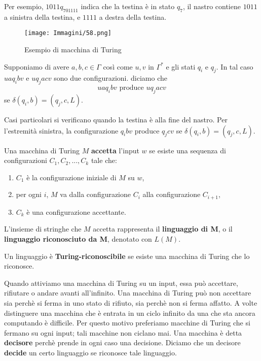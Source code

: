 \documentclass{article}
\begin{document}
Per esempio, $1011q_701111$ indica che la testina è in stato $q_7$, il nastro contiene $1011$ a sinistra della testina, e $1111$ a destra della testina.

\begin{figure}[H]
    \centering
    \texttt{[image: Immagini/58.png]}
    \caption{Esempio di macchina di Turing}
    \label{fig:turing_machine_example2}
\end{figure}

Supponiamo di avere $a,b,c \in \Gamma$ così come $u,v$ in $\Gamma^*$ e gli stati $q_i$ e $q_j$.
In tal caso $uaq_ibv$ e $uq_jacv$ sono due configurazioni. diciamo che 
$$
uaq_ibv \text{ produce } uq_jacv
$$
se $\delta(q_i,b) = (q_j,c,L)$.

Casi particolari si verificano quando la testina è alla fine del nastro.
Per l'estremità sinistra, la configurazione $q_ibv$ produce $q_jcv$ se $\delta(q_i,b) = (q_j,c,L)$.

Una macchina di Turing $M$ \textbf{accetta} l'input $w$ se esiste una sequenza di configurazioni $C_1,C_2,...,C_k$ tale che:
\begin{enumerate}
    \item $C_1$ è la configurazione iniziale di $M$ su $w$,
    \item per ogni $i$, $M$ va dalla configurazione $C_i$ alla configurazione $C_{i+1}$,
    \item $C_k$ è una configurazione accettante.
\end{enumerate}

L'insieme di stringhe che $M$ accetta rappresenta il \textbf{linguaggio di M}, o il \textbf{linguaggio riconosciuto da M}, denotato con $L(M)$.

\begin{tcolorbox}[colback=yellow!10!white, colframe=yellow!50!black, title=Definizione 3.5]
    Un linguaggio è \textbf{Turing-riconoscibile} se esiste una macchina di Turing che lo riconosce.
\end{tcolorbox}

Quando attiviamo una macchina di Turing su un input, essa può accettare, rifiutare o andare avanti all'infinito.
Una macchina di Turing può non accettare sia perchè si ferma in uno stato di rifiuto, sia perchè non si ferma affatto.
A volte distinguere una macchina che è entrata in un ciclo infinito da una che sta ancora computando è difficile.
Per questo motivo preferiamo macchine di Turing che si fermano su ogni input; tali macchine non ciclano mai.
Una macchina è detta \textbf{decisore} perchè prende in ogni caso una decisione.
Diciamo che un decisore \textbf{decide} un certo linguaggio se riconosce tale linguaggio.
\end{document}
